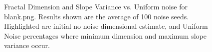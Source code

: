 \documentclass[12pt, oneside]{book}
\begin{document}
\begin{figure}[!b]
  \centering
  \caption[Fractal Dimension and Slope Variance vs. Uniform noise for blank.png.]{Fractal Dimension and Slope Variance vs. Uniform noise for blank.png.  Results shown are the average of 100 noise seeds.  Highlighted are initial no-noise dimensional estimate, and Uniform Noise percentages where minimum dimension and maximum slope variance occur.}
  \label{fig:blank_uniform_result}
\end{figure}
\end{document}
